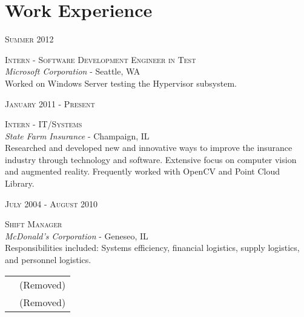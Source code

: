 \documentclass[10pt]{article}
\begin{document}
{{\begin{minipage}[t]{0.5\textwidth}
\section{Work Experience}

    \raggedleft
    \textsc{\normalsize Summer 2012}\par
    \raggedright\large \textsc{Intern - Software Development Engineer in Test} \\
    \emph{Microsoft Corporation} - Seattle, WA \\[5pt]

    \normalsize{ Worked on Windows Server testing the Hypervisor subsystem. \\[10pt]
    }

    \raggedleft
    \textsc{\normalsize January 2011 - Present}\par
    \raggedright\large \textsc{Intern - IT/Systems} \\
    \emph{State Farm Insurance} - Champaign, IL \\[5pt]

    \normalsize{
    Researched and developed new and innovative ways to improve the insurance industry
    through technology and software. Extensive focus on computer vision and augmented reality.
    Frequently worked with OpenCV and Point Cloud Library. \\[10pt]
    }

    \raggedleft
    \textsc{\normalsize July 2004 - August 2010}\par
    \raggedright\large \textsc{Shift Manager} \\
    \emph{McDonald's Corporation} - Geneseo, IL \\[5pt]

    \normalsize{
    Responsibilities included: Systems efficiency, financial logistics,
    supply logistics, and personnel logistics.\\[10pt]
    }


\end{minipage}
\hfill
\begin{minipage}[t]{0.44\textwidth}
    \vspace{0pt}

\colorbox{shade}{\textcolor{text1}{
    \begin{tabular}{c|p{7cm}}
        \raisebox{-3pt}{\Phone}         &(Removed) \\
        \raisebox{-3pt}{\Envelope}  &(Removed)
    \end{tabular}
    }
}\\[10pt]



\end{minipage}}}
\end{document}
